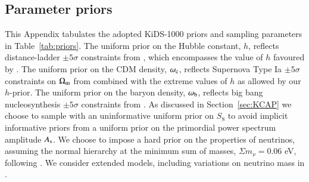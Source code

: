 \begin{appendix}
\section{Parameter priors}
\label{app:priors}
This Appendix tabulates the adopted KiDS-1000 priors and sampling parameters in Table~\ref{tab:priors}.   The uniform prior on the Hubble constant, $h$, reflects distance-ladder $\pm 5 \sigma$ constraints from \citet{riess/etal:2016}, which encompasses the value of $h$ favoured by \citet{planck/etal:2018}.  The uniform prior on the CDM density, $\omega_{\rm c}$, reflects Supernova Type Ia $\pm 5 \sigma$ constraints on $\Omega_{\rm m}$ from \citet{scolnic/etal:2018} combined with the extreme values of $h$ as allowed by our $h$-prior.   The uniform prior on the baryon density, $\omega_{\rm b}$, reflects big bang nucleosynthesis $\pm 5 \sigma$ constraints from \citet{olive/etal:2014}.   As discussed in Section~\ref{sec:KCAP} we choose to sample with an uninformative uniform prior on $S_8$ to avoid implicit informative priors from a uniform prior on the primordial power spectrum amplitude $A_{\rm s}$.    We choose to impose a hard prior on the properties of neutrinos, assuming the normal hierarchy at the minimum sum of masses, $\Sigma m_\nu = 0.06$ eV, following \citet{planck/etal:2018}.  We consider extended models, including variations on neutrino mass in \citet{troester/etal:inprep}.


\end{appendix}
